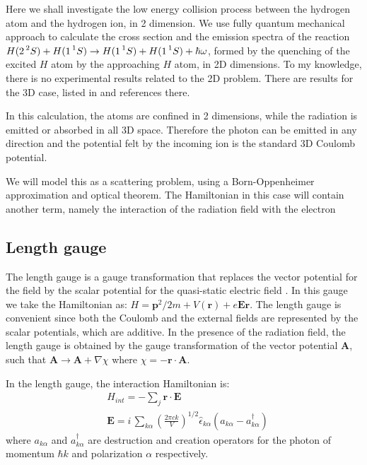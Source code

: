 Here we shall investigate the low energy collision process between the hydrogen atom and the hydrogen ion, in 2 dimension. We use fully quantum mechanical approach to calculate the cross section and the emission spectra of the reaction $ H(2\prescript{2}{}S) + H(1\prescript{1}{}S)\rightarrow H(1\prescript{1}{}S) + H(1\prescript{1}{}S) + \hbar\omega $, formed by the quenching of the excited $ H $ atom by the approaching $ H $ atom, in 2D dimensions. To my knowledge, there is no experimental results related to the 2D problem. There are results for the 3D case, listed in \cite{Zygelman88} and references there.

In this calculation, the atoms are confined in 2 dimensions, while the radiation is emitted or absorbed in all 3D space. Therefore the photon can be emitted in any direction and the potential felt by the incoming ion is the standard 3D Coulomb potential.

We will model this as a scattering problem, using a Born-Oppenheimer approximation and optical theorem. The Hamiltonian in this case will contain another term, namely the interaction of the radiation field with the electron

\subsection*{Length gauge}

The length gauge is a gauge transformation that replaces the vector potential for the field by the scalar potential for the quasi-static electric field \cite{LengthGauge3}.  In this gauge we take the Hamiltonian as: $ H = \mathbf{p}^2/2m + V(\mathbf{r})  + e\mathbf{E}\mathbf{r} $. The length gauge is convenient since both the Coulomb and the external fields are represented by the scalar potentials, which are additive. In the presence of the radiation field, the length gauge is obtained by the gauge transformation of the vector potential $ \mathbf{A} $, such that $ \mathbf{A} \rightarrow \mathbf{A} + \nabla \chi $ where $ \chi = - \mathbf{r} \cdot \mathbf{A} $. 

In the length gauge, the interaction Hamiltonian is:
\begin{equation}
\begin{split}
& H_{int} = -\sum_j{ \mathbf{r}\cdot\mathbf{E} } \\[.8em]
& \mathbf{E} = i\,\sum_{k\alpha}{\left(\frac{2\pi c k}{V}\right)^{1/2}\hat{\epsilon}_{k\alpha}\left(a_{k\alpha} - a^{\dagger}_{k\alpha}\right)}
\end{split}
\end{equation}
where $ a_{k\alpha} $ and $ a^{\dagger}_{k\alpha} $ are destruction and creation operators for the photon of momentum $ \hbar k $ and polarization $ \alpha $ respectively.

